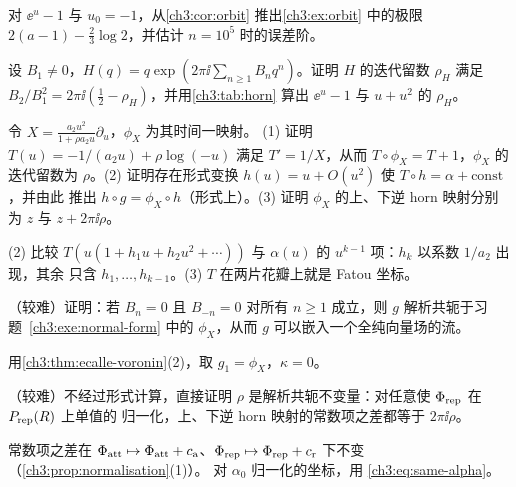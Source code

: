 \begin{exercise}\label{ch3:exe:orbit}
对 $\ee^u-1$ 与 $u_0=-1$，从\cref{ch3:cor:orbit} 推出\cref{ch3:ex:orbit} 中的极限
$2(a-1)-\tfrac23\log2$，并估计 $n=10^5$ 时的误差阶。
\end{exercise}

\begin{exercise}\label{ch3:exe:cylinder}
设 $B_1\ne0$，$H(q)=q\exp(2\pi\ii\sum_{n\ge1}B_nq^n)$。证明 $H$ 的迭代留数 $\rho_H$ 满足
$B_2/B_1^2=2\pi\ii(\tfrac12-\rho_H)$，并用\cref{ch3:tab:horn} 算出 $\ee^u-1$ 与 $u+u^2$ 的 $\rho_H$。
\end{exercise}

\begin{exercise}\label{ch3:exe:normal-form}
令 $X=\frac{a_2u^2}{1+\rho a_2u}\partial_u$，$\phi_X$ 为其时间一映射。
(1) 证明 $T(u)=-1/(a_2u)+\rho\log(-u)$ 满足 $T'=1/X$，从而 $T\circ\phi_X=T+1$，$\phi_X$ 的
迭代留数为 $\rho$。(2) 证明存在形式变换 $h(u)=u+O(u^2)$ 使 $T\circ h=\alpha+\mathrm{const}$，并由此
推出 $h\circ g=\phi_X\circ h$（形式上）。(3) 证明 $\phi_X$ 的上、下逆 horn 映射分别为 $z$ 与
$z+2\pi\ii\rho$。
\end{exercise}
\begin{hint}
(2) 比较 $T(u(1+h_1u+h_2u^2+\cdots))$ 与 $\alpha(u)$ 的 $u^{k-1}$ 项：$h_k$ 以系数 $1/a_2$ 出现，其余
只含 $h_1,\dots,h_{k-1}$。(3) $T$ 在两片花瓣上就是 Fatou 坐标。
\end{hint}

\begin{exercise}\label{ch3:exe:embed}
（较难）证明：若 $B_n=0$ 且 $B_{-n}=0$ 对所有 $n\ge1$ 成立，则 $g$ 解析共轭于习题~\ref{ch3:exe:normal-form}
中的 $\phi_X$，从而 $g$ 可以嵌入一个全纯向量场的流。
\end{exercise}
\begin{hint}
用\cref{ch3:thm:ecalle-voronin}(2)，取 $g_1=\phi_X$，$\kappa=0$。
\end{hint}

\begin{exercise}\label{ch3:exe:residue-analytic}
（较难）不经过形式计算，直接证明 $\rho$ 是解析共轭不变量：对任意使 $\Phi_{\mathrm{rep}}$ 在 $P_{\mathrm{rep}}(R)$ 上单值的
归一化，上、下逆 horn 映射的常数项之差都等于 $2\pi\ii\rho$。
\end{exercise}
\begin{hint}
常数项之差在 $\Phi_{\mathrm{att}}\mapsto\Phi_{\mathrm{att}}+c_{\mathrm a}$、$\Phi_{\mathrm{rep}}\mapsto\Phi_{\mathrm{rep}}+c_{\mathrm r}$ 下不变（\cref{ch3:prop:normalisation}(1)）。
对 $\alpha_0$ 归一化的坐标，用 \eqref{ch3:eq:same-alpha}。
\end{hint}
